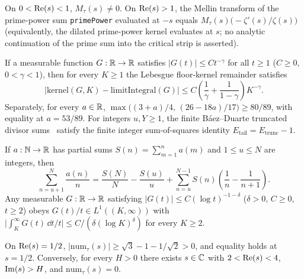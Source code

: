 \begin{theorem}
\label{thm:tent-mellin}
\leanok
On $0 < \operatorname{Re}(s) < 1$, $M_\tau(s) \ne 0$. On $\operatorname{Re}(s) > 1$, the Mellin transform of the prime-power sum \texttt{primePower} evaluated at $-s$ equals $M_\tau(s)\bigl(-\zeta'(s)/\zeta(s)\bigr)$ (equivalently, the dilated prime-power kernel evaluates at $s$; no analytic continuation of the prime sum into the critical strip is asserted).

If a measurable function $G : \mathbb{R} \to \mathbb{R}$ satisfies $|G(t)| \le C t^{-\gamma}$ for all $t \ge 1$ ($C \ge 0$, $0 < \gamma < 1$), then for every $K \ge 1$ the Lebesgue floor-kernel remainder satisfies
\[
  |\mathrm{kernel}(G, K) - \mathrm{limitIntegral}(G)| \le C\left(\frac{1}{\gamma} + \frac{1}{1-\gamma}\right) K^{-\gamma}.
\]
Separately, for every $a \in \mathbb{R}$, $\max\bigl((3+a)/4,\, (26-18a)/17\bigr) \ge 80/89$, with equality at $a = 53/89$. For integers $u, Y \ge 1$, the finite B\'aez--Duarte truncated divisor sums~\cite{baez2003} satisfy the finite integer sum-of-squares identity $E_{\mathrm{tail}} = E_{\mathrm{trunc}} - 1$.
\end{theorem}

\begin{theorem}
\label{thm:stieltjes-tail}
\leanok
If $a : \mathbb{N} \to \mathbb{R}$ has partial sums $S(n) = \sum_{m=1}^n a(m)$ and $1 \le u \le N$ are integers, then
\[
  \sum_{n=u+1}^N \frac{a(n)}{n} = \frac{S(N)}{N} - \frac{S(u)}{u} + \sum_{n=u}^{N-1} S(n)\!\left(\frac{1}{n} - \frac{1}{n+1}\right).
\]
Any measurable $G : \mathbb{R} \to \mathbb{R}$ satisfying $|G(t)| \le C(\log t)^{-1-\delta}$ ($\delta > 0$, $C \ge 0$, $t \ge 2$) obeys $G(t)/t \in L^1((K, \infty))$ with $\bigl|\int_K^\infty G(t)\,\dd t/t\bigr| \le C/(\delta (\log K)^\delta)$ for every $K \ge 2$.
\end{theorem}

\begin{theorem}
\label{thm:tent-obstructions}
\leanok
On $\operatorname{Re}(s) = 1/2$, $|\mathrm{num}_\tau(s)| \ge \sqrt{3} - 1 - 1/\sqrt{2} > 0$, and equality holds at $s = 1/2$. Conversely, for every $H > 0$ there exists $s \in \mathbb{C}$ with $2 < \operatorname{Re}(s) < 4$, $\operatorname{Im}(s) > H$, and $\mathrm{num}_\tau(s) = 0$.
\end{theorem}

